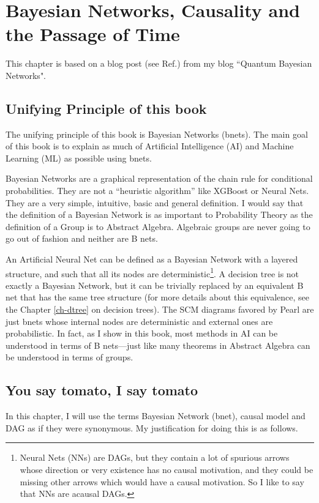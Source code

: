 \chapter{Bayesian Networks, Causality and the
Passage of Time}

\label{ch-passage-time}

This chapter is based
on a blog post (see Ref.\cite{bnets-passage-time})
from my blog ``Quantum Bayesian Networks".

\section{Unifying Principle of this book}
The unifying principle of this
book is Bayesian Networks (bnets).
The main goal of this book
is to explain
as much of Artificial Intelligence (AI)
and Machine Learning (ML)
as possible
using bnets.

Bayesian Networks are a graphical representation of the chain rule for
conditional probabilities.
 They are not a ``heuristic algorithm” like XGBoost or Neural Nets.
They are a very simple, intuitive, basic and general definition. I would say
that the definition of a Bayesian Network is as important to Probability
Theory as the definition of a Group is to Abstract Algebra. Algebraic groups
are never going to go out of fashion and neither are B nets.

An Artificial Neural Net can be defined as a Bayesian Network with a layered
structure, and such that all its nodes are deterministic\footnote{Neural Nets (NNs)
are DAGs, but they contain a lot of 
spurious arrows whose direction
or very existence has no causal motivation,
and they could be missing
other arrows which 
would have a causal motivation.
 So I like to
say that NNs are acausal DAGs.}. A decision tree
is not exactly a Bayesian Network, but it can be trivially replaced by an
equivalent B net that has the same tree structure (for more details about
this equivalence, see the Chapter \ref{ch-dtree} on decision trees).
The SCM diagrams favored by Pearl are just bnets
whose internal nodes are deterministic and external ones
are probabilistic.
In fact, as I show in this book, most methods in AI can be
understood in terms of B nets---just
like many theorems in Abstract Algebra
can be understood in terms of groups.



\section{You say tomato, I say tomato}
In this chapter, I will use the terms Bayesian Network
(bnet), causal model and DAG as if they were synonymous.
My justification for doing this is as follows.



